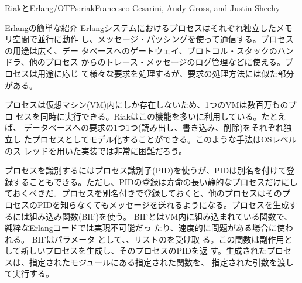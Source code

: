 \begin{aosachapter}{RiakとErlang/OTP}{s:riak}{Francesco Cesarini, Andy Gross, and Justin Sheehy}
\begin{aosasect1}{Erlangの簡単な紹介}
Erlangシステムにおけるプロセスはそれぞれ独立したメモリ空間で並行に動作
し、メッセージ・パッシングを使って通信する。プロセスの用途は広く、デー
タベースへのゲートウェイ、プロトコル・スタックのハンドラ、他のプロセス
からのトレース・メッセージのログ管理などに使える。プロセスは用途に応じ
て様々な要求を処理するが、要求の処理方法には似た部分がある。


プロセスは仮想マシン(VM)内にしか存在しないため、1つのVMは数百万ものプロ
セスを同時に実行できる。Riakはこの機能を多いに利用している。たとえば、
データベースへの要求の1つ1つ(読み出し、書き込み、削除)をそれぞれ独立し
たプロセスとしてモデル化することができる。このような手法はOSレベルのス
レッドを用いた実装では非常に困難だろう。


プロセスを識別するにはプロセス識別子(PID)を使うが、PIDは別名を付けて登
録することもできる。ただし、PIDの登録は寿命の長い静的なプロセスだけにし
ておくべきだ。プロセスを別名付きで登録しておくと、他のプロセスはそのプ
ロセスのPIDを知らなくてもメッセージを送れるようになる。プロセスを生成す
るには組み込み関数(BIF)を使う。
BIFとはVM内に組み込まれている関数で、純粋なErlangコードでは実現不可能だっ
たり、速度的に問題がある場合に使われる。 BIFはパラメータ
として、、リストのを受け取
る。この関数は副作用として新しいプロセスを生成し、そのプロセスのPIDを返
す。生成されたプロセスは、指定されたモジュールにある指定された関数を、
指定された引数を渡して実行する。


\end{aosasect1}
\end{aosachapter}
